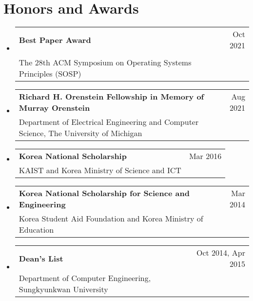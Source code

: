 \documentclass[letterpaper,oneside,11pt]{article}
\makeatletter
\newcommand{\resumeItem}[2]{
  \item\small{
    \textbf{#1}{: #2 \vspace{-3pt}}
  }
}
\newcommand{\resumeSubheading}[4]{
  \vspace{-1pt}\item
    \begin{tabularx}{0.97\textwidth}[t]{X@{\hspace{20pt}}r}
      \textbf{#1} & #2 \\
      \small#3 & \small #4 \\
    \end{tabularx}\vspace{-3pt}
}
\newcommand{\resumeSubHeadingListStart}{\begin{itemize}[leftmargin=*]}
\newcommand{\resumeSubHeadingListEnd}{\end{itemize}}
\makeatother
\begin{document}
\section{Honors and Awards}
  \resumeSubHeadingListStart
    \resumeSubheading{Best Paper Award}{Oct 2021}
    {\makecell{``LineFS: Efficient SmartNIC Offload of a Distributed File System with Pipeline Parallelism'' \\ The 28th ACM Symposium on Operating Systems Principles (SOSP)}}{}
    \resumeSubheading{Richard H. Orenstein Fellowship in Memory of Murray Orenstein}{Aug 2021}
    {Department of Electrical Engineering and Computer Science, The University of Michigan}{}
    \resumeSubheading{Korea National Scholarship}{Mar 2016}
    {KAIST and Korea Ministry of Science and ICT}{}
    \resumeSubheading{Korea National Scholarship for Science and Engineering}
    {Mar 2014}
    {Korea Student Aid Foundation and Korea Ministry of Education}{}
    \resumeSubheading{Dean's List}{Oct 2014, Apr 2015}
    {Department of Computer Engineering, Sungkyunkwan University}{}
  \resumeSubHeadingListEnd

%

\end{document}
